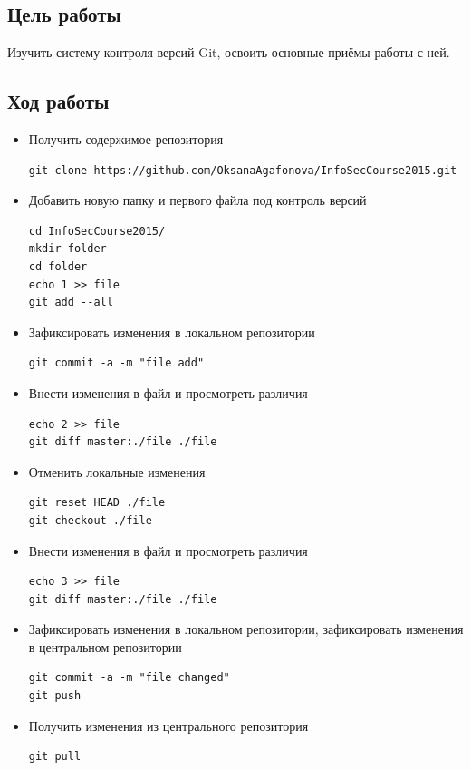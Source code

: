 \documentclass[10pt,a4paper]{article}
\begin{document}
\subsection{Цель работы}
Изучить систему контроля версий Git, освоить основные приёмы работы с ней.

\subsection{Ход работы}

\begin{itemize}

\item{Получить содержимое репозитория
\begin{verbatim}git clone https://github.com/OksanaAgafonova/InfoSecCourse2015.git
\end{verbatim}}

\item{Добавить новую папку и первого файла под контроль версий
\begin{verbatim}cd InfoSecCourse2015/
mkdir folder
cd folder
echo 1 >> file
git add --all
\end{verbatim}}

\item{Зафиксировать изменения в локальном репозитории
\begin{verbatim}git commit -a -m "file add"
\end{verbatim}}

\item{Внести изменения в файл и просмотреть различия
\begin{verbatim}echo 2 >> file
git diff master:./file ./file
\end{verbatim}}

\item{Отменить локальные изменения
\begin{verbatim}git reset HEAD ./file
git checkout ./file
\end{verbatim}}

\item{Внести изменения в файл и просмотреть различия
\begin{verbatim}echo 3 >> file
git diff master:./file ./file
\end{verbatim}}

\item{Зафиксировать изменения в локальном репозитории, зафиксировать изменения в центральном репозитории
\begin{verbatim}git commit -a -m "file changed"
git push
\end{verbatim}}

\item{Получить изменения из центрального репозитория
\begin{verbatim}git pull
\end{verbatim}}

\end{itemize}
\end{document}

